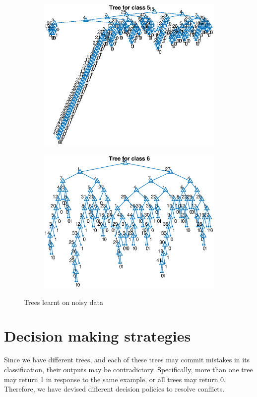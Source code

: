 \documentclass{article}
\begin{document}
\begin{figure}
\begin{subfigure}[b]{.49\textwidth}
   \includegraphics[width=\textwidth]{noisytree5.eps}
 \end{subfigure}
 \begin{subfigure}[b]{.49\textwidth}
   \includegraphics[width=\textwidth]{noisytree6.eps}
 \end{subfigure}
 \caption{Trees learnt on noisy data}
 \label{fig:noisytrees}
\end{figure}


\newpage

\section{Decision making strategies}
\label{sec:decision_strategies}
Since we have different trees, and each of these trees may commit mistakes in its classification, their outputs may be contradictory. Specifically, more than one tree may return 1 in response to the same example, or all trees may return 0. Therefore, we have devised different decision policies to resolve conflicts.
\end{document}
